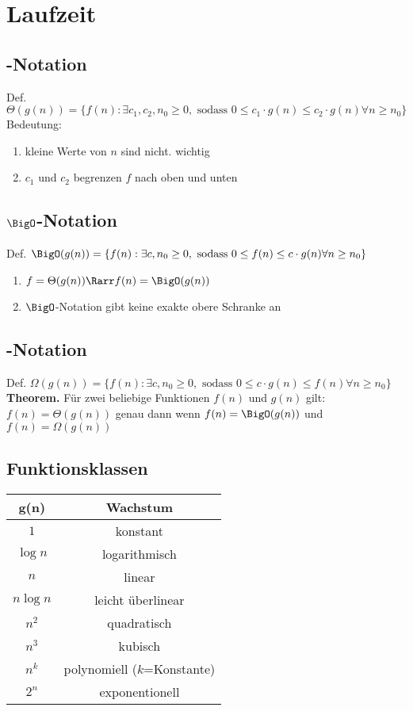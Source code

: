 	\section{Laufzeit}
	\subsection{\Theta-Notation}Def. $\Theta(g(n))=\{f(n):\exists c_1,c_2,n_0\geq 0, \text{ sodass } 0\leq c_1\cdot g(n)\leq c_2\cdot g(n)\forall n \geq n_0\}$ \newline \newline
		Bedeutung: 	
		\begin{enumerate}
		\item kleine Werte von $n$ sind nicht. wichtig 
		\item $c_1$ und $c_2$ begrenzen $f$ nach oben und unten
	\end{enumerate} 
	\subsection{$\BigO$-Notation}
		Def. $\BigO(g(n))=\{f(n):\exists c,n_0\geq 0, \text{ sodass }0\leq f(n)\leq c\cdot g(n)\forall n\geq n_0\}$	 \newline \newline
		\begin{enumerate}
			\item $f=\Theta(g(n))\Rarr f(n)=\BigO(g(n))$
			\item $\BigO$-Notation gibt keine exakte obere Schranke an
		\end{enumerate}
		\subsection{\Omega-Notation}
			Def. $\Omega(g(n))=\{f(n):\exists c,n_0\geq 0, \text{ sodass } 0\leq c\cdot g(n)\leq f(n)\forall n\geq n_0\}$ \newline \newline
		\textbf{Theorem.} Für zwei beliebige Funktionen $f(n)$ und $g(n)$ gilt: $f(n) = \Theta(g(n))$ genau dann wenn $f(n)=\BigO(g(n))$ und $f(n)=\Omega(g(n))$
		\subsection{Funktionsklassen}
		\begin{center}
			
		
		\begin{tabular} {c c}
			\hline
			g(n) & \textbf{Wachstum} \\
			\hline
			$1$ & konstant \\
			$\log n$ & logarithmisch \\
			$n$ & linear \\
			$n\log n$ & leicht überlinear \\
			$n^2$ & quadratisch \\
			$n^3$ & kubisch \\
			$n^k$ & polynomiell ($k$=Konstante) \\
			$2^n$ & exponentionell
		\end{tabular}
		\end{center} 
